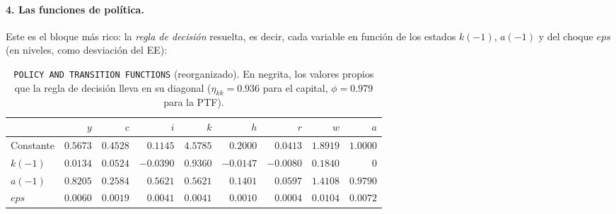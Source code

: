 \documentclass[11pt,a4paper]{report}
\begin{document}
\paragraph{4. Las funciones de política.} Este es el bloque más rico: la
\emph{regla de decisión} resuelta, es decir, cada variable en función de los
estados $k(-1)$, $a(-1)$ y del choque $eps$ (en niveles, como desviación del EE):

\begin{table}[H]
\centering\footnotesize
\setlength{\tabcolsep}{4.5pt}
\begin{tabular}{lrrrrrrrr}
\toprule
 & $y$ & $c$ & $i$ & $k$ & $h$ & $r$ & $w$ & $a$\\
\midrule
Constante & $0.5673$ & $0.4528$ & $0.1145$ & $4.5785$ & $0.2000$ & $0.0413$ & $1.8919$ & $1.0000$\\
$k(-1)$   & $0.0134$ & $0.0524$ & $-0.0390$ & $\mathbf{0.9360}$ & $-0.0147$ & $-0.0080$ & $0.1840$ & $0$\\
$a(-1)$   & $0.8205$ & $0.2584$ & $0.5621$ & $0.5621$ & $0.1401$ & $0.0597$ & $1.4108$ & $\mathbf{0.9790}$\\
$eps$     & $0.0060$ & $0.0019$ & $0.0041$ & $0.0041$ & $0.0010$ & $0.0004$ & $0.0104$ & $0.0072$\\
\bottomrule
\end{tabular}
\caption{\texttt{POLICY AND TRANSITION FUNCTIONS} (reorganizado). En negrita, los
valores propios que la regla de decisión lleva en su diagonal
($\eta_{kk}=0.936$ para el capital, $\phi=0.979$ para la PTF).}
\label{tab:polout}
\end{table}
\end{document}
